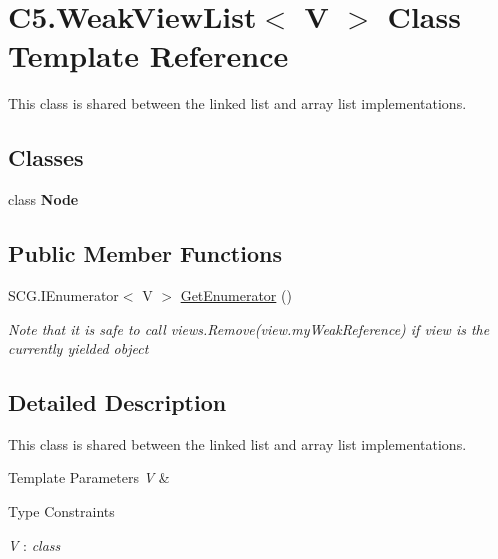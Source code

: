 \hypertarget{class_c5_1_1_weak_view_list}{}\section{C5.\+Weak\+View\+List$<$ V $>$ Class Template Reference}
\label{class_c5_1_1_weak_view_list}


This class is shared between the linked list and array list implementations.  


\subsection*{Classes}
\begin{DoxyCompactItemize}
\item 
class {\bfseries Node}
\end{DoxyCompactItemize}
\subsection*{Public Member Functions}
\begin{DoxyCompactItemize}
\item 
S\+C\+G.\+I\+Enumerator$<$ V $>$ \hyperlink{class_c5_1_1_weak_view_list_a244788297d130473898c7cab600d65e4}{Get\+Enumerator} ()
\begin{DoxyCompactList}\small\item\em Note that it is safe to call views.\+Remove(view.\+my\+Weak\+Reference) if view is the currently yielded object \end{DoxyCompactList}\end{DoxyCompactItemize}


\subsection{Detailed Description}
This class is shared between the linked list and array list implementations. 


\begin{DoxyTemplParams}{Template Parameters}
{\em V} & \\
\hline
\end{DoxyTemplParams}
\begin{Desc}
\item[Type Constraints]\begin{description}
\item[{\em V} : {\em class}]\end{description}
\end{Desc}


